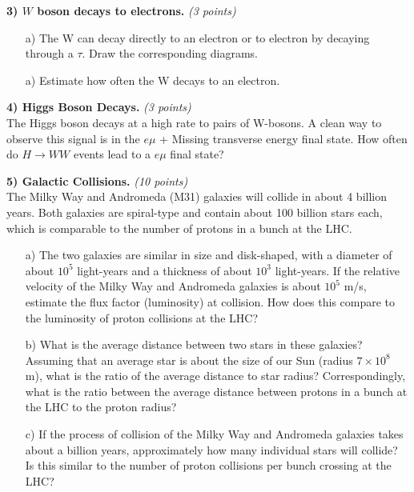 {\vspace*{0.25in}

\textbf{3)  $W$ boson decays to electrons. } \hfill \textit{(3 points)}\\
\begin{itemize}
\item[a)]{ The W can decay directly to an electron or to electron by decaying through a $\tau$. Draw the corresponding diagrams.}
\item[a)]{ Estimate how often the W decays to an electron. }
\end{itemize}           

\vspace*{0.25in}

\textbf{4) Higgs Boson Decays. } \hfill \textit{(3 points)}\\
The Higgs boson decays at a high rate to pairs of W-bosons.
A clean way to observe this signal is in the $e\mu$ + Missing transverse energy final state. How often do $H\rightarrow WW$ events lead to a $e\mu$ final state?

\vspace*{0.25in}

\textbf{5) Galactic Collisions.} \hfill \textit{(10 points)}\\
The Milky Way and Andromeda (M31) galaxies will collide in about 4 billion years. 
Both galaxies are spiral-type and contain about 100 billion stars each, which is comparable to the number of protons in a bunch at the LHC. 
\begin{itemize}
\item[a)] {The two galaxies are similar in size and disk-shaped, with a diameter of about $10^5$ light-years and a thickness of about $10^3$ light-years. 
If the relative velocity of the Milky Way and Andromeda galaxies is about $10^5$ m/s, estimate the flux factor (luminosity) at collision. 
How does this compare to the luminosity of proton collisions at the LHC?
}
\item[b)] {What is the average distance between two stars in these galaxies? 
Assuming that an average star is about the size of our Sun (radius $7 \times 10^8$ m), what is the ratio of the average distance to star radius? 
Correspondingly, what is the ratio between the average distance between protons in a bunch at the LHC to the proton radius? 
}
\item[c)] {If the process of collision of the Milky Way and Andromeda galaxies takes about a billion years, approximately how many individual stars will collide? 
Is this similar to the number of proton collisions per bunch crossing at the LHC?}
\end{itemize}


}






